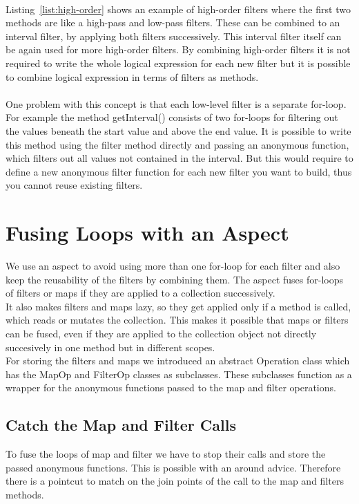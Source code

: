 \documentclass[runningheads,a4paper]{llncs}
\begin{document}
\lstset{caption=Implementation of an interval filter method., label=list:high-order}

\\
Listing~\ref{list:high-order} shows an example of high-order filters where the first two methods are like a high-pass and low-pass filters.
These can be combined to an interval filter, by applying both filters successively. This interval filter itself can be again used for more high-order filters.
By combining high-order filters it is not required to write the whole logical expression for each new filter but it is possible to combine logical expression in terms of filters as methods.\\
\\
One problem with this concept is that each low-level filter is a separate for-loop. For example the method getInterval() consists of two for-loops for filtering out the values beneath the start value and above the end value.
It is possible to write this method using the filter method directly and passing an anonymous function, which filters out all values not contained in the interval.
But this would require to define a new anonymous filter function for each new filter you want to build, thus you cannot reuse existing filters.\\

\section{Fusing Loops with an Aspect} \label{sub:fusing-aspect}
We use an aspect to avoid using more than one for-loop for each filter and also keep the reusability of the filters by combining them.
The aspect fuses for-loops of filters or maps if they are applied to a collection successively.\\
It also makes filters and maps lazy, so they get applied only if a method is called, which reads or mutates the collection.
This makes it possible that maps or filters can be fused, even if they are applied to the collection object not directly succesively in one method but in different scopes.\\
For storing the filters and maps we introduced an abstract Operation class which has the MapOp and FilterOp classes as subclasses.
These subclasses function as a wrapper for the anonymous functions passed to the map and filter operations.

\subsection{Catch the Map and Filter Calls}\label{subs:map-and-filter}
To fuse the loops of map and filter we have to stop their calls and store the passed anonymous functions.
This is possible with an around advice. Therefore there is a pointcut to match on the join points of the call to the map and filters methods.
\end{document}
